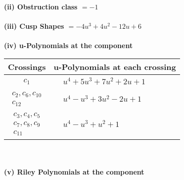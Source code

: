 \documentclass[1p]{elsarticle_modified}
\theoremstyle{definition}
\begin{document}
\flushleft \textbf{(ii) Obstruction class $= -1$}\\~\\
\flushleft \textbf{(iii) Cusp Shapes $= -4 u^3+4 u^2-12 u+6$}\\~\\
\newpage\renewcommand{\arraystretch}{1}
\flushleft \textbf{(iv) u-Polynomials at the component}\newline \\
\begin{tabular}{m{50pt}|m{274pt}}
Crossings & \hspace{64pt}u-Polynomials at each crossing \\
\hline $$\begin{aligned}c_{1}\end{aligned}$$&$\begin{aligned}
&u^4+5 u^3+7 u^2+2 u+1
\end{aligned}$\\
\hline $$\begin{aligned}c_{2},c_{6},c_{10}\\c_{12}\end{aligned}$$&$\begin{aligned}
&u^4- u^3+3 u^2-2 u+1
\end{aligned}$\\
\hline $$\begin{aligned}c_{3},c_{4},c_{5}\\c_{7},c_{8},c_{9}\\c_{11}\end{aligned}$$&$\begin{aligned}
&u^4- u^3+u^2+1
\end{aligned}$\\
\hline
\end{tabular}\\~\\
\newpage\renewcommand{\arraystretch}{1}
\flushleft \textbf{(v) Riley Polynomials at the component}\newline \\
\end{document}

